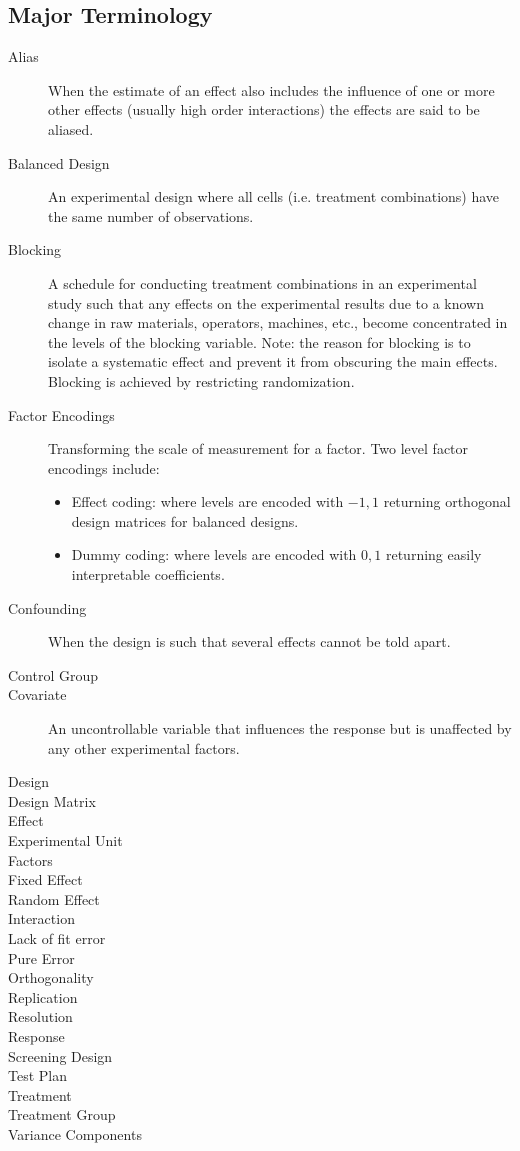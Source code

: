 \subsection{Major Terminology}

\begin{description}
\item [Alias] When the estimate of an effect also includes the influence of one or more other effects (usually high order interactions) the effects are said to be aliased.
\item [Balanced Design] An experimental design where all cells (i.e. treatment combinations) have the same number of observations.
\item [Blocking] A schedule for conducting treatment combinations in an experimental study such that any effects on the experimental results due to a known change in raw materials, operators, machines, etc., become concentrated in the levels of the blocking variable. Note: the reason for blocking is to isolate a systematic effect and prevent it from obscuring the main effects. Blocking is achieved by restricting randomization.
\item [Factor Encodings] Transforming the scale of measurement for a factor. 
Two level factor encodings include:
\begin{itemize}
\item Effect coding: where levels are encoded with $-1,1$ returning orthogonal design matrices for balanced designs.
\item Dummy coding: where levels are encoded with $0,1$ returning easily interpretable coefficients.
\end{itemize}

\item [Confounding] When the design is such that several effects cannot be told apart. 
\item [Control Group] 
\item [Covariate]  An uncontrollable variable that influences the response but is
unaffected by any other experimental factors.
\item [Design]
\item [Design Matrix]
\item [Effect]
\item [Experimental Unit]
\item [Factors]
\item [Fixed Effect]
\item [Random Effect]
\item [Interaction]
\item [Lack of fit error]
\item [Pure Error]
\item [Orthogonality]
\item [Replication]
\item [Resolution]
\item [Response]
\item [Screening Design]
\item [Test Plan]
\item [Treatment]
\item [Treatment Group]
\item [Variance Components]
\end{description}
